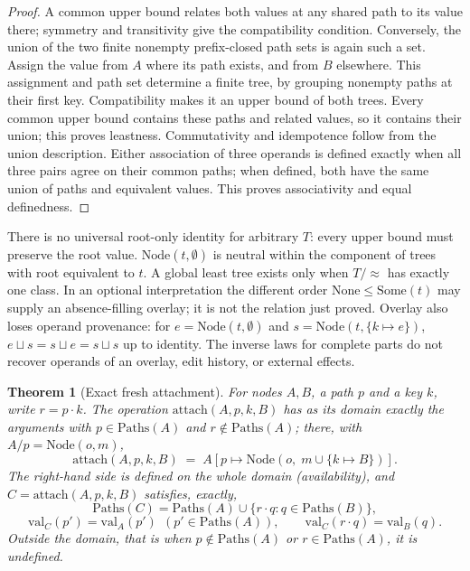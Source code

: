 \documentclass[11pt]{article}
\newtheorem{theorem}{Theorem}[section]
\theoremstyle{definition}
\newcommand{\Paths}{\mathrm{Paths}}
\begin{document}
\begin{proof}
A common upper bound relates both values at any shared path to its value there;
symmetry and transitivity give the compatibility condition. Conversely, the union
of the two finite nonempty prefix-closed path sets is again such a set. Assign the
value from $A$ where its path exists, and from $B$ elsewhere. This assignment and
path set determine a finite tree, by grouping nonempty paths at their first key.
Compatibility makes it an upper bound of both trees. Every common upper bound
contains these paths and related values, so it contains their union; this proves
leastness. Commutativity and idempotence follow from the union description.
Either association of three operands is defined exactly when all three pairs
agree on their common paths; when defined, both have the same union of paths and
equivalent values. This proves associativity and equal definedness.
\end{proof}

There is no universal root-only identity for arbitrary $T$: every upper bound must
preserve the root value. $\mathrm{Node}(t,\emptyset)$ is neutral within the component
of trees with root equivalent to $t$. A global least tree exists only when
$T/\!\approx$ has exactly one class. In an optional interpretation the different
order $\mathrm{None}\leq\mathrm{Some}(t)$ may supply an absence-filling overlay;
it is not the relation just proved. Overlay also loses operand provenance:
for $e=\mathrm{Node}(t,\emptyset)$ and $s=\mathrm{Node}(t,\{k\mapsto e\})$,
$e\sqcup s = s\sqcup e = s\sqcup s$ up to identity. The inverse laws for complete
parts do not recover operands of an overlay, edit history, or external effects.

\begin{theorem}[Exact fresh attachment]\label{thm:attach}
For nodes $A, B$, a path $p$ and a key $k$, write $r = p \cdot k$. The operation
$\mathrm{attach}(A, p, k, B)$ has as its domain exactly the arguments with $p \in \Paths(A)$
and $r \notin \Paths(A)$; there, with $A/p = \mathrm{Node}(o, m)$,
\[
\mathrm{attach}(A, p, k, B) \;=\; A[p \mapsto \mathrm{Node}(o,\; m \cup \{k \mapsto B\})].
\]
The right-hand side is defined on the whole domain (availability), and
$C = \mathrm{attach}(A, p, k, B)$ satisfies, exactly,
\[
\Paths(C) = \Paths(A) \cup \{r \cdot q : q \in \Paths(B)\},
\]
\[
\mathrm{val}_C(p') = \mathrm{val}_A(p') \ \ (p' \in \Paths(A)), \qquad
\mathrm{val}_C(r \cdot q) = \mathrm{val}_B(q).
\]
Outside the domain, that is when $p \notin \Paths(A)$ or $r \in \Paths(A)$, it is undefined.
\end{theorem}
\end{document}
